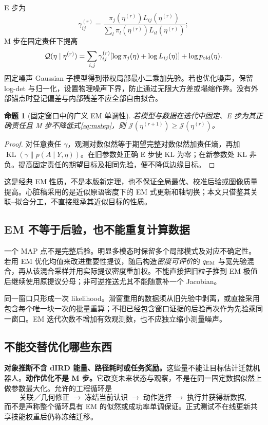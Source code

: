 \documentclass[UTF8,fontset=fandol,11pt,a4paper]{ctexart}
\theoremstyle{plain}
\newtheorem{proposition}[theorem]{命题}
\theoremstyle{definition}
\theoremstyle{remark}
\numberwithin{equation}{section}
\DeclareMathOperator{\KL}{KL}
\begin{document}
E 步为
\begin{equation}
\gamma_{ij}^{(r)}=\frac{\pi_j(\eta^{(r)})L_{ij}(\eta^{(r)})}
{\sum_l\pi_l(\eta^{(r)})L_{il}(\eta^{(r)})};
\end{equation}
M 步在固定责任下提高
\begin{equation}
\mathcal Q(\eta\mid\eta^{(r)})=
\sum_{i,j}\gamma_{ij}^{(r)}[\log\pi_j(\eta)+\log L_{ij}(\eta)]
+\log p_{\rm old}(\eta).
\label{eq:mstep}
\end{equation}
固定噪声 Gaussian 子模型得到带权局部最小二乘加先验。若也优化噪声，保留 log-det 与归一化，设置物理噪声下界，防止通过无限大方差或塌缩作弊。没有外部锚点时登记偏差与内部残差不应全部自由拟合。

\begin{proposition}[固定窗口中的广义 EM 单调性]
若模型与数据在迭代中固定、E 步为其正确责任且 M 步不降低式\eqref{eq:mstep}，则 $\mathcal J(\eta^{(r+1)})\ge\mathcal J(\eta^{(r)})$。
\end{proposition}
\begin{proof}
对任意责任 $\gamma$，观测对数似然等于期望完整对数似然加责任熵，再加 $\KL(\gamma\|p(A\mid Y,\eta))$。在旧参数处正确 E 步使 KL 为零；在新参数处 KL 非负。提高固定责任的期望目标及相同先验，便不降低边缘目标\cite{em}。
\end{proof}

这是经典 EM 性质，不是本版新定理，也不保证全局最优、校准后验或图像质量提高。心脏稿采用的是近似原语密度下的 EM 式更新和轴切换\cite{cardiac}；本文只借鉴其关联--拟合分工，不直接继承其近似目标的性质。

\subsection{EM 不等于后验，也不能重复计算数据}
一个 MAP 点不是完整后验。明显多模态时保留多个局部模式及对应不确定性。若用 EM 优化均值来改进重要性提议，随后构造\emph{密度可评价}的 $q_{\rm EM}$ 与宽先验混合，再从该混合采样并用实际提议密度重加权。不能直接把旧粒子推到 EM 极值后继续使用原提议分母；非可逆推送尤其不能随意补一个 Jacobian。

同一窗口只形成一次 likelihood。滑窗重用的数据须从旧先验中剥离，或直接采用包含每个唯一块一次的批量重算；不把已经包含窗口证据的后验再次作为先验乘同一窗口。EM 迭代次数不增加有效观测数，也不应独立缩小测量噪声。

\subsection{不能交替优化哪些东西}
\textbf{对象推断不含 dIRD 能量、路径耗时或任务奖励。}这些量不能让目标估计迁就机器人。\textbf{动作优化不是 M 步。}它改变未来状态与观察，不是在同一固定数据似然上做参数最大化。允许的工程循环是
\[
\text{关联／几何修正}\;\to\;\text{冻结当前认识}\;\to\;
\text{动作选择}\;\to\;\text{执行并获得新数据},
\]
而不是声称整个循环具有 EM 的似然或成功率单调保证。正式测试不在线更新共享技能权重后仍称冻结迁移。
\end{document}
